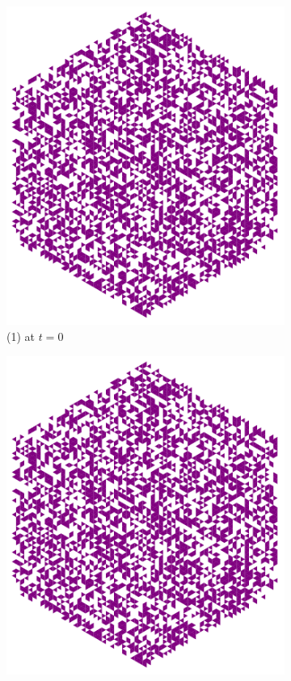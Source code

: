 \documentclass{article}
\begin{document}
\begin{figure}[H]
     \centering
     \begin{subfigure}[b]{0.3\textwidth}
         \centering
         \includegraphics[width=\textwidth]{graphics/behavior/chaos/chaos-1-1.pdf}
         \caption*{(1) at $t=0$}
     \end{subfigure}
     \hspace{0.17\textwidth}
     \begin{subfigure}[b]{0.3\textwidth}
         \centering
         \includegraphics[width=\textwidth]{graphics/behavior/chaos/chaos-2-1.pdf}

\end{subfigure}
\end{figure}
\end{document}
